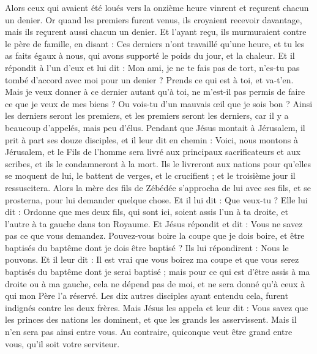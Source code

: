 \begin{multicols}{2}
Alors ceux qui avaient été loués vers la onzième heure vinrent et reçurent chacun un denier.
Or quand les premiers furent venus, ils croyaient recevoir davantage, mais ils reçurent aussi chacun un denier.
Et l'ayant reçu, ils murmuraient contre le père de famille,
en disant : Ces derniers n'ont travaillé qu'une heure, et tu les as faits égaux à nous, qui avons supporté le poids du jour, et la chaleur.
Et il répondit à l'un d'eux et lui dit : Mon ami, je ne te fais pas de tort, n'es-tu pas tombé d'accord avec moi pour un denier ?
Prends ce qui est à toi, et va-t'en. Mais je veux donner à ce dernier autant qu'à toi,
ne m'est-il pas permis de faire ce que je veux de mes biens ? Ou vois-tu d'un mauvais œil que je sois bon ?
Ainsi les derniers seront les premiers, et les premiers seront les derniers, car il y a beaucoup d'appelés, mais peu d'élus.
Pendant que Jésus montait à Jérusalem, il prit à part ses douze disciples, et il leur dit en chemin :
Voici, nous montons à Jérusalem, et le Fils de l'homme sera livré aux principaux sacrificateurs et aux scribes, et ils le condamneront à la mort.
Ils le livreront aux nations pour qu'elles se moquent de lui, le battent de verges, et le crucifient ; et le troisième jour il ressuscitera.
Alors la mère des fils de Zébédée s'approcha de lui avec ses fils, et se prosterna, pour lui demander quelque chose.
Et il lui dit : Que veux-tu ? Elle lui dit : Ordonne que mes deux fils, qui sont ici, soient assis l'un à ta droite, et l'autre à ta gauche dans ton Royaume.
Et Jésus répondit et dit : Vous ne savez pas ce que vous demandez. Pouvez-vous boire la coupe que je dois boire, et être baptisés du baptême dont je dois être baptisé ? Ils lui répondirent : Nous le pouvons.
Et il leur dit : Il est vrai que vous boirez ma coupe et que vous serez baptisés du baptême dont je serai baptisé ; mais pour ce qui est d'être assis à ma droite ou à ma gauche, cela ne dépend pas de moi, et ne sera donné qu'à ceux à qui mon Père l'a réservé.
Les dix autres disciples ayant entendu cela, furent indignés contre les deux frères.
Mais Jésus les appela et leur dit : Vous savez que les princes des nations les dominent, et que les grands les asservissent.
Mais il n'en sera pas ainsi entre vous. Au contraire, quiconque veut être grand entre vous, qu'il soit votre serviteur.

\end{multicols}
